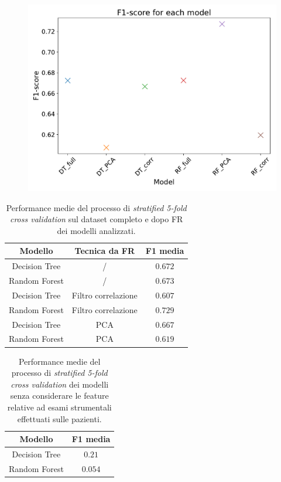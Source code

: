 \begin{figure}
	\centering
	\includegraphics[width=0.8\linewidth]{images/fscore}
	\caption{}
	\label{fig:fscore}
\end{figure}

\begin{table}
\centering
\caption{Performance medie del processo di \textit{stratified 5-fold cross validation} sul dataset completo e dopo FR dei modelli analizzati.}
\label{tab:f1score}
\begin{tabular}{|c|c|c|}
	\toprule
	Modello & Tecnica da FR & F1 media \\ 
	\midrule 
	Decision Tree & / & $0.672$ \\  
	Random Forest & / & $0.673$ \\ 
	Decision Tree & Filtro correlazione & $0.607$ \\ 
	Random Forest & Filtro correlazione & $0.729$ \\ 
	Decision Tree & PCA & $0.667$ \\ 
	Random Forest & PCA & $0.619$ \\ 
	\bottomrule
\end{tabular}
\end{table}

\begin{table}
	\centering
	\caption{Performance medie del processo di \textit{stratified 5-fold cross validation} dei modelli senza considerare le feature relative ad esami strumentali effettuati sulle pazienti.}
	\label{tab:noexamsscore}
	\begin{tabular}{|c|c|}
		\toprule
		Modello & F1 media \\ 
		\midrule 
		Decision Tree & $0.21$ \\  
		Random Forest  & $0.054$ \\ 
		\bottomrule
	\end{tabular}
\end{table}

